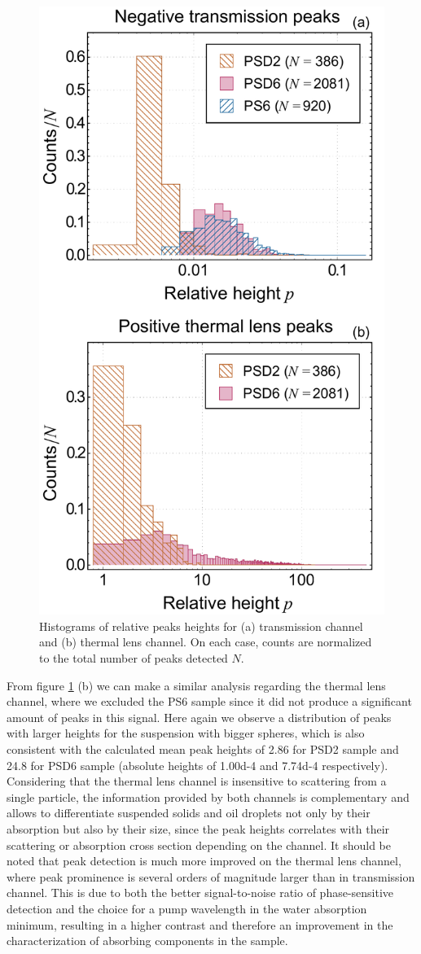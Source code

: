 \documentclass[9pt,twocolumn,twoside]{osajnl}
\begin{document}
\begin{figure}[t!]
	\centering \includegraphics[width=.46\textwidth]{figures/PeakHeightDistribution.pdf}
	\caption{Histograms of relative peaks heights for (a) transmission channel and (b) thermal lens channel. On each case, counts are normalized to the total number of peaks detected $N$.}
	\label{fig:PeakHistogram}
\end{figure}

From figure \ref{fig:PeakHistogram} (b) we can make a similar analysis regarding the thermal lens channel, where we excluded the PS6 sample since it did not produce a significant amount of peaks in this signal. Here again we observe a distribution of peaks with larger heights for the suspension with bigger spheres, which is also consistent with the calculated mean peak heights of \SI{2.86}{} for PSD2 sample and \SI{24.8}{} for PSD6 sample (absolute heights of \SI{1.00d-4}{} and \SI{7.74d-4}{} respectively). Considering that the thermal lens channel is insensitive to scattering from a single particle, the information provided by both channels is complementary and allows to differentiate suspended solids and oil droplets not only by their absorption but also by their size, since the peak heights correlates with their scattering or absorption cross section depending on the channel. It should be noted that peak detection is much more improved on the thermal lens channel, where peak prominence is several orders of magnitude larger than in transmission channel. This is due to both the better signal-to-noise ratio of phase-sensitive detection and the choice for a pump wavelength in the water absorption minimum, resulting in a higher contrast and therefore an improvement in the characterization of absorbing components in the sample. \\
\end{document}
